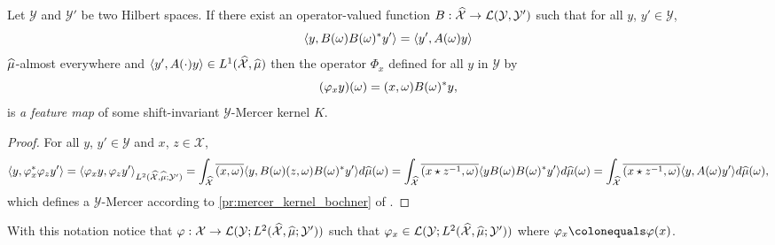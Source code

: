 \begin{proposition}\label{pr:fourier_feature_map}
Let $\mathcal{Y}$ and $\mathcal{Y}'$ be two Hilbert spaces. If there exist an operator-valued function $B:\widehat{\mathcal{X}}\to\mathcal{L}(\mathcal{Y},\mathcal{Y}')$ such that for all $y$, $y'\in\mathcal{Y}$,
\begin{dmath*}
\inner{y, B(\omega)B(\omega)^\adjoint y'}=\inner{y', A(\omega)y}
\end{dmath*}
$\widehat{\mu}$-almost everywhere and $\langle y', A(\cdot)y\rangle\in L^1(\widehat{\mathcal{X}},\widehat{\mu})$ then the operator $\Phi_x$ defined for all $y$ in $\mathcal{Y}$ by
\begin{dmath}
\label{eq:feature_shiftinv_map}
(\Phi_x y)(\omega)=\pairing{x,\omega}B(\omega)^\adjoint y,
\end{dmath}
is \emph{a feature map} of some shift-invariant $\mathcal{Y}$-Mercer kernel $K$.
\end{proposition}
\begin{proof}
For all $y$, $y'\in \mathcal{Y}$ and $x$, $z\in\mathcal{X}$,
\begin{dmath*}
\inner{y, \Phi_x^\adjoint \Phi_z y'} = \inner{\Phi_x y, \Phi_z y'}_{L^2(\dual{\mathcal{X}},\dual{\mu};\mathcal{Y}')} \\
= \int_{\dual{\mathcal{X}}}\conj{\pairing{x,\omega}}\inner{y, B(\omega)\pairing{z,\omega}B(\omega)^\adjoint y'}d\dual{\mu}(\omega) \\
= \int_{\dual{\mathcal{X}}}\conj{\pairing{x \groupop \myinv{z},\omega}}\inner{y B(\omega)B(\omega)^\adjoint y'}d\dual{\mu}(\omega) \\
= \int_{\dual{\mathcal{X}}}\conj{\pairing{x \groupop \inv{z},\omega}}\inner{y,A(\omega)y'}d\dual{\mu}(\omega),
\end{dmath*}
which defines a $\mathcal{Y}$-Mercer according to \cref{pr:mercer_kernel_bochner} of \citet{Carmeli2010}.
\end{proof}
With this notation notice that $\Phi: \mathcal{X} \to \mathcal{L}(\mathcal{Y}; L^2(\dual{\mathcal{X}}, \dual{\mu}; \mathcal{Y}'))$ such that $\Phi_x\in \mathcal{L}(\mathcal{Y}; L^2(\dual{\mathcal{X}}, \dual{\mu}; \mathcal{Y}'))$ where $\Phi_x\colonequals\Phi(x)$.


